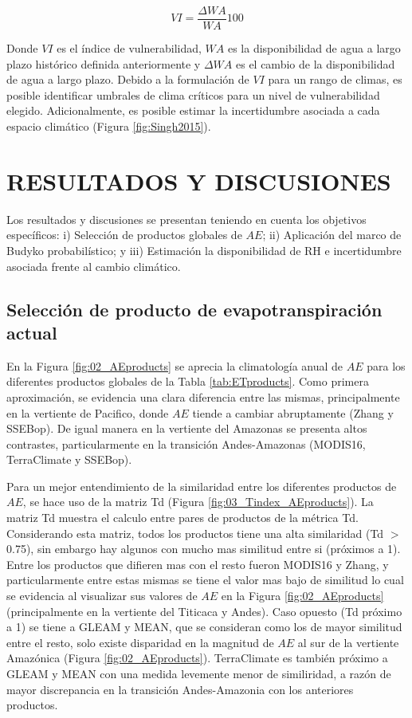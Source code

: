\documentclass[12pt]{article}
\begin{document}
\begin{equation}
VI = \frac{\Delta WA}{WA}100
\end{equation}

Donde $VI$ es el índice de vulnerabilidad, $WA$ es la disponibilidad de agua a largo plazo histórico definida anteriormente y $\Delta WA$ es el cambio de la disponibilidad de agua a largo plazo. Debido a la formulación de $VI$ para un rango de climas, es posible identificar umbrales de clima críticos para un nivel de vulnerabilidad elegido. Adicionalmente, es posible estimar la incertidumbre asociada a cada espacio climático (Figura \ref{fig:Singh2015}).

\clearpage
\vspace*{0.5mm}
\section{RESULTADOS Y DISCUSIONES}

Los resultados y discusiones se presentan teniendo en cuenta los objetivos específicos: i) Selección de productos globales de $AE$; ii) Aplicación del marco de Budyko probabilístico; y iii) Estimación la disponibilidad de RH e incertidumbre asociada frente al cambio climático.

\subsection{Selección de producto de evapotranspiración actual}

En la Figura \ref{fig:02_AEproducts} se aprecia la climatología anual de $AE$ para los diferentes productos globales de la Tabla \ref{tab:ETproducts}. Como primera aproximación, se evidencia una clara diferencia entre las mismas, principalmente en la vertiente de Pacifico, donde $AE$ tiende a cambiar abruptamente (Zhang y SSEBop). De igual manera en la vertiente del Amazonas se presenta altos contrastes, particularmente en la transición Andes-Amazonas (MODIS16, TerraClimate y SSEBop). 



Para un mejor entendimiento de la similaridad entre los diferentes productos de $AE$, se hace uso de la matriz Td (Figura \ref{fig:03_Tindex_AEproducts}). La matriz Td muestra el calculo entre pares de productos de la métrica Td. Considerando esta matriz, todos los productos tiene una alta similaridad (Td $>$ 0.75), sin embargo hay algunos con mucho mas similitud entre si (próximos a 1). Entre los productos que difieren mas con el resto fueron MODIS16 y Zhang, y particularmente entre estas mismas se tiene el valor mas bajo de similitud lo cual se evidencia al visualizar sus valores de $AE$ en la Figura \ref{fig:02_AEproducts} (principalmente en la vertiente del Titicaca y Andes). Caso opuesto (Td próximo a 1) se tiene a GLEAM y MEAN, que se consideran como los de mayor similitud entre el resto, solo existe disparidad en la magnitud de $AE$ al sur de la vertiente Amazónica (Figura \ref{fig:02_AEproducts}). TerraClimate es también próximo a GLEAM y MEAN con una medida levemente menor de similiridad, a razón de mayor discrepancia en la transición Andes-Amazonia con los anteriores productos.
\end{document}
